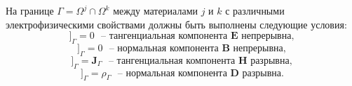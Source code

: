 \documentclass[a4paper,14pt]{article}
\newcommand{\Jmp}[1]{[\![ { #1 } ]\!]}
\begin{document}
На границе $\Gamma = \Omega^j \cap \Omega^k$ между материалами $j$ и $k$ с различными электрофизическими свойствами должны быть выполнены следующие условия:
\begin{equation}
	\Jmp{ \mathbf{E} \times \mathbf{n} }_{\Gamma} = 0 \text{~~--~тангенциальная компонента $\mathbf{E}$ непрерывна}, \label{eq:maxwell:tangent_E}
\end{equation}
\begin{equation*}
	\Jmp{ \mathbf{B} \cdot \mathbf{n} }_{\Gamma} = 0 \text{~~--~нормальная компонента $\mathbf{B}$ непрерывна}, \label{eq:maxwell:normal_B}
\end{equation*}
\begin{equation*}
	\Jmp{ \mathbf{H} \times \mathbf{n} }_{\Gamma} = \mathbf{J}_{\Gamma} \text{~~--~тангенциальная компонента $\mathbf{H}$ разрывна}, \label{eq:maxwell:tangent_H}
\end{equation*}
\begin{equation}
	\Jmp{ \mathbf{D} \cdot \mathbf{n} }_{\Gamma} = \rho_{\Gamma} \text{~~--~нормальная компонента $\mathbf{D}$ разрывна}. \label{eq:maxwell:normal_D}
\end{equation}
\end{document}
